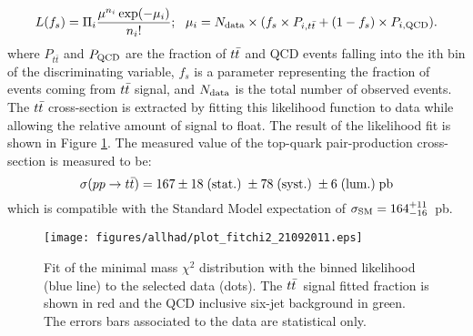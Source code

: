 \begin{equation}
L(f_s) = \Pi_{i} \frac{ \mu^{n_{i}} \exp(-\mu_i) }{n_{i}!}; \ \  \mu_{i} = N_{{\rm data}} \times ( f_s \times P_{i,t\bar{t}}  + (1 - f_{s}) \times P_{i,{\rm QCD}}).
\end{equation}
where $P_{t\bar{t}}$ and $P_{{\rm QCD}}$ are the fraction of $\ttbar$ and QCD events falling into the ith bin of the discriminating variable, 
$f_s$ is a parameter representing the fraction of events coming from $\ttbar$ signal, 
and $N_{{\rm data}}$ is the total number of observed events.
The $\ttbar$ cross-section is extracted by fitting this likelihood function to data while allowing the relative amount of signal to float.
The result of the likelihood fit is shown in Figure \ref{fig:fitchi2_3_Jet.eps}. 
The measured value of the top-quark pair-production cross-section is measured to be:
\begin{equation*}
 \sigma {(pp \to t\bar{t})} = 167 \pm 18 \; {\rm (stat.)} \; \pm 78 \; {\rm (syst.)} \;  \pm 6 \;  {\rm (lum.)} \; {\rm pb}
\end{equation*}
which is compatible with the Standard Model expectation of  $\sigma_{{\rm SM}} = 164^{+11} _{-16}$~pb.



\begin{figure}[h!]
  \begin{center}
    \texttt{[image: figures/allhad/plot\_fitchi2\_21092011.eps]}
  \end{center}
  \caption{Fit of the minimal mass $\chi^2$ distribution with the binned likelihood (blue line) to the selected data (dots). The $\ttbar$~signal fitted fraction is shown in red and the QCD inclusive six-jet background  in green. The errors bars associated to the data are statistical only.}
  \label{fig:fitchi2_3_Jet.eps}
\end{figure}



